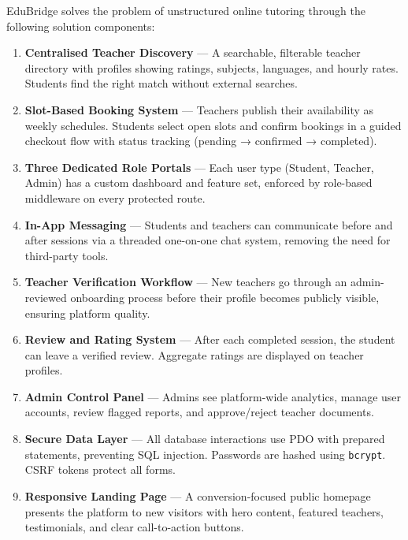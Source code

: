 \documentclass[12pt,a4paper]{report}
\begin{document}
\vspace{0.4cm}
EduBridge solves the problem of unstructured online tutoring through the following solution components:

\vspace{0.3cm}
\begin{enumerate}[leftmargin=1.8em, itemsep=5pt]
    \item \textbf{Centralised Teacher Discovery} — A searchable, filterable teacher directory with profiles showing ratings, subjects, languages, and hourly rates. Students find the right match without external searches.

    \item \textbf{Slot-Based Booking System} — Teachers publish their availability as weekly schedules. Students select open slots and confirm bookings in a guided checkout flow with status tracking (pending → confirmed → completed).

    \item \textbf{Three Dedicated Role Portals} — Each user type (Student, Teacher, Admin) has a custom dashboard and feature set, enforced by role-based middleware on every protected route.

    \item \textbf{In-App Messaging} — Students and teachers can communicate before and after sessions via a threaded one-on-one chat system, removing the need for third-party tools.

    \item \textbf{Teacher Verification Workflow} — New teachers go through an admin-reviewed onboarding process before their profile becomes publicly visible, ensuring platform quality.

    \item \textbf{Review and Rating System} — After each completed session, the student can leave a verified review. Aggregate ratings are displayed on teacher profiles.

    \item \textbf{Admin Control Panel} — Admins see platform-wide analytics, manage user accounts, review flagged reports, and approve/reject teacher documents.

    \item \textbf{Secure Data Layer} — All database interactions use PDO with prepared statements, preventing SQL injection. Passwords are hashed using \texttt{bcrypt}. CSRF tokens protect all forms.

    \item \textbf{Responsive Landing Page} — A conversion-focused public homepage presents the platform to new visitors with hero content, featured teachers, testimonials, and clear call-to-action buttons.
\end{enumerate}
\end{document}
